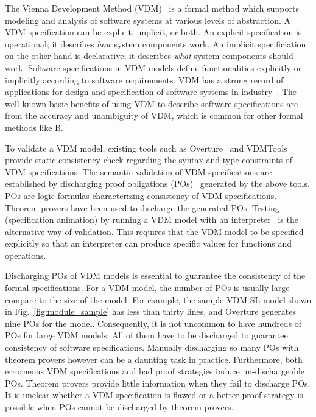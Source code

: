The Vienna Development Method (VDM)~\cite{Jones:1990:SSD:94062,Fitzgerald:2005:VDO:1044891,Fitz:PGLarson:2009book} is a formal method which supports modeling and analysis of software systems at various levels of abstraction. A VDM specification can be explicit, implicit, or both. An explicit specification is operational; it describes \emph{how} system components work. An implicit specificiation on the other hand is declarative; it describes \emph{what} system components should work. Software specifications in VDM models define functionalities explicitly or implicitly according to software requirements. VDM has a strong record of applications for design and specification of software systems in industry~\cite{Larsen:2007:RIA:2227886.2227894,DBLP:conf/fm/KuritaCN08,DBLP:journals/ijsi/KuritaN09}. The well-known basic benefits of using VDM to describe software specifications are from the accuracy and unambiguity of VDM, which is common for other formal methods like B. 

To validate a VDM model, existing tools such as Overture~\cite{Larsen:2010:OII:1668862.1668864} and VDMTools provide static consistency check regarding the syntax and type constraints of VDM specifications. The semantic validation of VDM specifications are established by discharging proof obligations (POs)~\cite{AL:97:POGV} generated by the above tools. POs are logic formulas characterizing consistency of VDM specifications. Theorem provers have been used to discharge the generated POs. Testing (specification animation) by running a VDM model with an interpreter~\cite{Prehn:1991:LNCS551} is the alternative way of validation. This requires that the VDM model to be specified explicitly so that an interpreter can produce specific values for functions and operations.

Discharging POs of VDM models is essential to guarantee the consistency of the formal specifications. For a VDM model, the number of POs is usually large compare to the size of the model. For example, the sample VDM-SL model shown in Fig.~\ref{fig:module_sample} has less than thirty lines, and Overture generates nine POs for the model. Consequently, it is not uncommon to have hundreds of POs for large VDM models. All of them have to be discharged to guarantee consistency of software specifications. Manually discharging so many POs with theorem provers however can be a daunting task in practice. Furthermore, both errorneous VDM specifications and bad proof strategies induce un-dischargeable POs. Theorem provers provide little information when they fail to discharge POs. It is unclear whether a VDM specification is flawed or a better proof strategy is possible when POs cannot be discharged by theorem provers.


